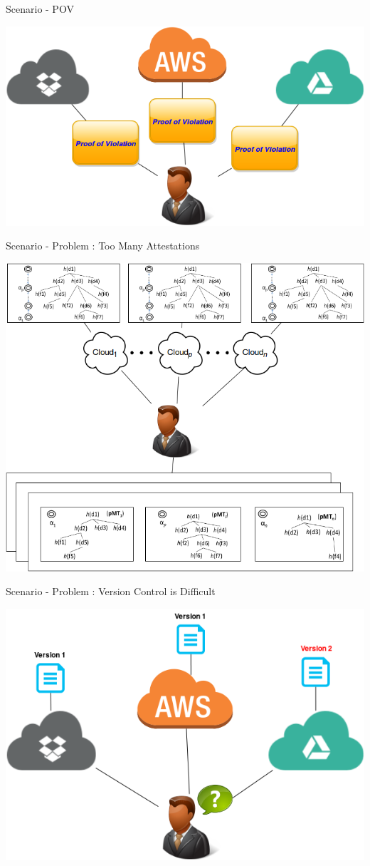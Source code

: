 \documentclass{beamer}
\newcommand{\RNum}[1]{\uppercase\expandafter{\romannumeral #1\relax}}
\begin{document}
\begin{CJK}{UTF8}{bkai}
\begin{frame}{Scenario - POV}
	\begin{center}
	\includegraphics[width=.95\textwidth]{Scenario3.png}
	\end{center}
\end{frame}

\begin{frame}{Scenario - Problem \RNum{1} : Too Many Attestations}
	\begin{center}
	\includegraphics[width=.7\textwidth]{Scenario4.png}
	\end{center}
\end{frame}

\begin{frame}{Scenario - Problem \RNum{2} : Version Control is Difficult}
	\begin{center}
	\includegraphics[width=.8\textwidth]{Scenario5.png}
	\end{center}
\end{frame}


\end{CJK}
\end{document}
